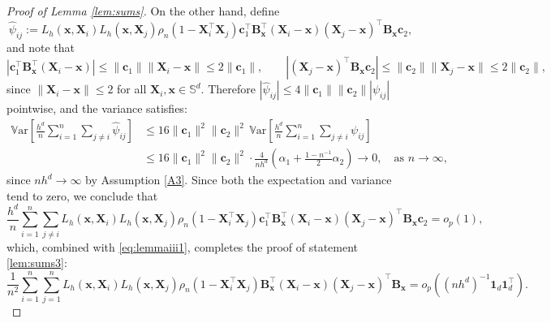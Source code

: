 \documentclass[12pt]{report} %
\newcommand{\bX}{\mathbf{X}}
\newcommand{\bx}{\mathbf{x}}
\newcommand{\bc}{\mathbf{c}}
\newcommand{\Sd}{\mathbb{S}^{d}}
\newcommand{\bB}{\mathbf{B}}
\newcommand{\lc}{\left[}
\newcommand{\rc}{\right]}
\newcommand{\V}[1]{\mathbb{V}\mathrm{ar}\lc #1\rc}
\begin{document}
\begin{proof}[Proof of Lemma \ref{lem:sums}]
On the other hand, define 
\begin{equation*}
\widehat{\psi}_{ij} := L_h\left(\bx, \bX_i\right)L_h\left(\bx, \bX_j\right)
\rho_n\left(1-\bX_i^\top\bX_j\right)
\bc_1^\top\bB_{\bx}^\top\left(\bX_i -\bx\right)\left(\bX_j-\bx\right)^\top\bB_{\bx}\bc_2,
\end{equation*}
and note that
\begin{equation*}
\left|\bc_1^\top\bB_{\bx}^\top\left(\bX_i - \bx\right)\right| 
\leq \|\bc_1\|\|\bX_i - \bx\| \leq 2\|\bc_1\|, \qquad
\left|\left(\bX_j-\bx\right)^\top\bB_{\bx}\bc_2\right| 
\leq \|\bc_2\|\|\bX_j - \bx\| \leq 2\|\bc_2\|,
\end{equation*}
since $\|\bX_i - \bx\| \leq 2$ for all $\bX_i, \bx \in \Sd$. Therefore $|\widehat{\psi}_{ij}| \leq 4\|\bc_1\|\|\bc_2\||\psi_{ij}|$ pointwise, and the variance satisfies:
\begin{align*}
\V{\frac{h^d}{n}\sum_{i=1}^n\sum_{j\neq i}\widehat{\psi}_{ij}}
&\leq 16\|\bc_1\|^2\|\bc_2\|^2\,\V{\frac{h^d}{n}\sum_{i=1}^n\sum_{j\neq i}\psi_{ij}}\\
&\leq 16\|\bc_1\|^2\|\bc_2\|^2\cdot\frac{4}{nh^d}\left(\alpha_1 + \frac{1-n^{-1}}{2}\alpha_2\right) 
\longrightarrow 0, \quad \text{as } n \to \infty,
\end{align*}
since $nh^d\to\infty$ by Assumption \ref{A3}. Since both the expectation and variance tend to zero, we conclude that
\begin{equation*}
\frac{h^d}{n}\sum_{i=1}^n\sum_{j\neq i}
L_h\left(\bx, \bX_i\right)L_h\left(\bx, \bX_j\right)
\rho_n\left(1-\bX_i^\top\bX_j\right)
\bc_1^\top\bB_{\bx}^\top\left(\bX_i -\bx\right)\left(\bX_j-\bx\right)^\top\bB_{\bx}\bc_2 = o_p(1),
\end{equation*}
which, combined with \eqref{eq:lemmaiii1}, completes the proof of statement \ref{lem:sums3}:
\begin{equation*}
\frac{1}{n^2}\sum_{i=1}^n\sum_{j=1}^n
L_h\left(\bx, \bX_i\right)L_h\left(\bx, \bX_j\right)
\rho_n\left(1-\bX_i^\top\bX_j\right)
\bB_{\bx}^\top\left(\bX_i -\bx\right)\left(\bX_j-\bx\right)^\top\bB_{\bx}
= o_p\!\left(\left(nh^d\right)^{-1}\mathbf{1}_d\mathbf{1}_d^\top\right).
\end{equation*}
\end{proof}
\end{document}
